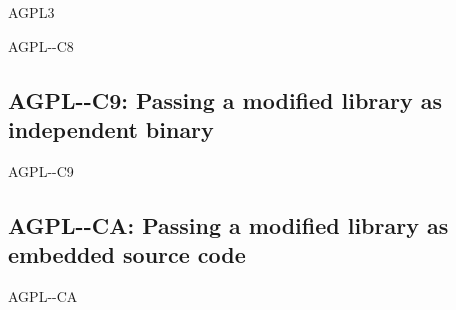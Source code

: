\begin{license}{AGPL3}
\begin{lsuc}{AGPL-\ver-C8}
  \useCaseEight

  \begin{lsucrequires}
     \lsucmandatory{\keepLicenseElements}
    \lsucmandatory{\gplthreeEnsureCopyrightNoticeSource}
    \lsucmandatory{\giveLicense}\passingFilesCorrectly
    \lsucmandatory{\retainCopyrightNotices}
    \lsucmandatory{\markLibraryModifications}
    \lsucmandatory{\arrangeLibraryChanges}\howToApplyTheseTerms
    \lsucoptional{\createChangelog}
    \lsucoptional{\addToDocumentation}
  \end{lsucrequires}

  \begin{lsucprohibits}
    \lsucitem{\noPatentLitigation}
  \end{lsucprohibits}
\end{lsuc}

\subsection{AGPL-\ver-C9: Passing a modified library as independent binary}
\begin{lsuc}{AGPL-\ver-C9}

  \useCaseNine

  \begin{lsucrequires}
    \lsucmandatory{\keepLicenseElements}
    \lsucmandatory{\gplthreeEnsureCopyrightNoticeSource}  
    \lsucmandatory{\giveLicense}\passingFilesCorrectly
    \lsucmandatory{\retainCopyrightNotices}
    \lsucmandatory{\makeModifiedSourceAvailable}
    \lsucmandatory{\describeHowToGetSource}
    \lsucmandatory{\markLibraryModifications}
    \lsucmandatory{\arrangeLibraryChanges}\howToApplyTheseTerms
    \lsucoptional{\createChangelog}
    \lsucoptional{\addToDocumentation}
  \end{lsucrequires}

  \begin{lsucprohibits}
    \lsucitem{\noPatentLitigation}
  \end{lsucprohibits}
\end{lsuc}

\subsection{AGPL-\ver-CA: Passing a modified library as embedded source code}
\begin{lsuc}{AGPL-\ver-CA}


\end{lsuc}
\end{license}
